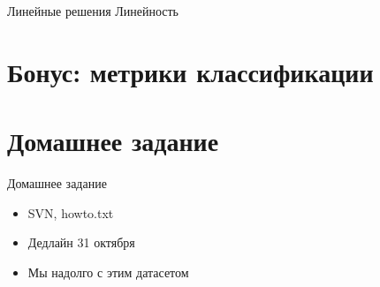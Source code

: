 \documentclass[14pt, fleqn, xcolor={dvipsnames, table}]{beamer}
\begin{document}
\begin{frame}{Линейные решения}
Линейность
\end{frame}

\section{Бонус: метрики классификации}

\section{Домашнее задание}

\begin{frame}{Домашнее задание}
\begin{itemize}
\item SVN, howto.txt
\item Дедлайн 31 октября
\item Мы надолго с этим датасетом
\end{itemize}
\end{frame}
\end{document}
